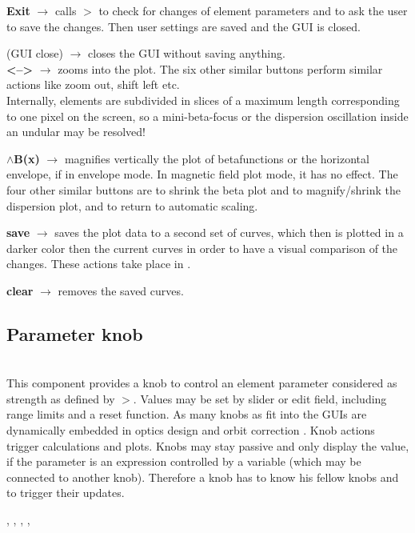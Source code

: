 \documentclass[12pt]{article}
\newcommand\code[1]{{\tt #1}}
\newcommand{\ofld}[1]{\colorbox{black!15}{{{\color{black}\bf #1}}}}
\newcommand{\ofldx}[1]{\colorbox{black!15}{{\color{black}(#1)}}}
\newcommand\guico[1]{{\color{blue}\code{#1}}}
\newcommand{\unico}[1]{{\color{burntorange}\code{#1}}}
\newcommand{\evcod}[2]{\ofld{#1} $\rightarrow$ \guico{#2}}
\newcommand{\evcodx}[2]{\ofldx{#1} $\rightarrow$ \guico{#2}}
\newcommand{\prcod}[2]{\opauni{#1}$>$\unico{#2}}
\newcommand{\opagui}[1]{\colorbox{blue!20}{{\color{black}\code{#1}}}}
\newcommand{\ogui}[1]{\hyperref[#1]{\opagui{#1}}}
\newcommand{\opaguif}[1]{\colorbox{violet!30}{{\color{black}\code{#1}}}}
\newcommand{\oguifh}[2]{\subsection{\label{#2}#1}{\Huge\opaguif{#2}}\\}
\newcommand{\opauni}[1]{\colorbox{orange!30}{{\color{black}\code{#1}}}}
\newcommand{\ouni}[1]{\hyperref[#1]{\opauni{#1}}}
\newcommand{\uses}[1]{\flushleft {\bf Uses:} #1}
\newcommand{\desc}[1]{#1}
\newcommand{\feature}[1]{{\color{cadmiumgreen} #1}}
\begin{document}
{\evcod{Exit}{butexitClick} calls \prcod{globlib}{EllaSave} to check for changes of element parameters and to ask the user to save the changes. Then user settings are saved and the GUI is closed.

\evcodx{GUI close}{FormClose} closes the GUI without saving anything.\\

\evcod{\textless--\textgreater}{buzoominClick} zooms into the plot. The six other similar buttons perform similar actions like zoom out, shift left etc.\\ \feature{Internally, elements are subdivided in slices of a maximum length corresponding to one pixel on the screen, so a mini-beta-focus or the dispersion oscillation inside an undular may be resolved!}

\evcod{$\wedge$B(x)}{buyupClick} magnifies vertically the plot of betafunctions or the horizontal envelope, if in envelope mode. In magnetic field plot mode, it has no effect. The four other similar buttons are to shrink the beta plot and to magnify/shrink  the dispersion plot, and to return to automatic scaling.

\evcod{save}{bucsaveClick} saves the plot data to a second set of curves, which then is plotted in a darker color then the current curves in order to have a visual comparison of the changes. These actions take place in \ouni{linoplib}.

\evcod{clear}{bucclearClick} removes the saved curves.

}




\oguifh{Parameter knob}{knobframe} 

\desc{This component provides a knob to control an element parameter considered as strength as defined by \prcod{OPAgloal}{putkval/getkval}. Values may be set by slider or edit field, including range limits and a reset function. As many knobs as fit into the GUIs are dynamically embedded in optics design \ogui{opalinop} and orbit correction \ogui{opaorbit}. Knob actions trigger calculations and plots. Knobs may stay passive and only display the value, if the parameter is an expression controlled by a variable (which may be connected to another knob). Therefore a knob has to know his fellow knobs and to trigger their updates.}

\uses{\ouni{globlib}, \ouni{mathlib}, \ouni{varlib}, \ouni{linoplib},  \ouni{comauxlib}} 
 
\end{document}

